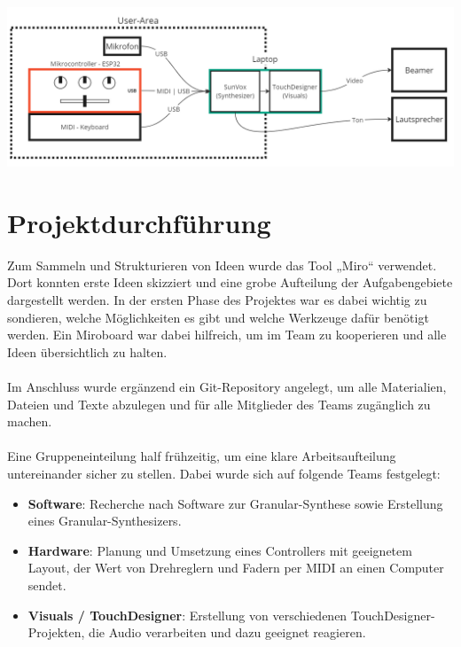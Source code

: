 \documentclass[12pt]{scrartcl}%
\theoremstyle{nonumberplain}
\begin{document}
\begin{center}
 \includegraphics[scale=0.5]{Blockschaltbild}
\end{center}

\newpage

\section{Projektdurchführung}

Zum Sammeln und Strukturieren von Ideen wurde das Tool „Miro“ verwendet. Dort konnten erste Ideen skizziert und eine grobe Aufteilung der Aufgabengebiete dargestellt werden. In der ersten Phase des Projektes war es dabei wichtig zu sondieren, welche Möglichkeiten es gibt und welche Werkzeuge dafür benötigt werden. Ein Miroboard war dabei hilfreich, um im Team zu kooperieren und alle Ideen übersichtlich zu halten.
\\\\
Im Anschluss wurde ergänzend ein Git-Repository angelegt, um alle Materialien, Dateien und Texte abzulegen und für alle Mitglieder des Teams zugänglich zu machen.
\\\\
Eine Gruppeneinteilung half frühzeitig, um eine klare Arbeitsaufteilung untereinander sicher zu stellen. Dabei wurde sich auf folgende Teams festgelegt: 
\begin{itemize}
  \item \textbf{Software}: Recherche nach Software zur Granular-Synthese sowie Erstellung eines Granular-Synthesizers.
  \item \textbf{Hardware}: Planung und Umsetzung eines Controllers mit geeignetem Layout, der Wert von Drehreglern und Fadern per MIDI an einen Computer sendet.
  \item \textbf{Visuals / TouchDesigner}: Erstellung von verschiedenen TouchDesigner-Projekten, die Audio verarbeiten und dazu geeignet reagieren.
\end{itemize}
\end{document}
